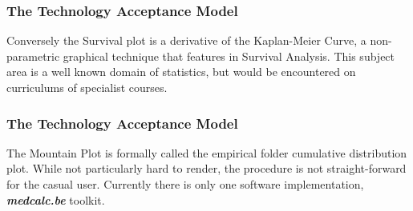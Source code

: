 \documentclass[pdf,azure,slideColor,colorBG]{prosper}
\begin{document}
\begin{frame}
	\frametitle{The Technology Acceptance Model}	
	Conversely the Survival plot is a derivative of the Kaplan-Meier Curve, a non-parametric graphical technique that features in Survival Analysis. This subject area is a well known domain of statistics, but would be encountered 
	on curriculums of specialist courses. 
\end{frame}
\begin{frame}
	\frametitle{The Technology Acceptance Model}	
	The Mountain Plot is formally called the empirical folder cumulative distribution plot. While not particularly hard to render, the procedure is not straight-forward for the casual user. Currently there is only one software implementation, \textbf{\textit{medcalc.be}} toolkit.
\end{frame}
\end{document}
